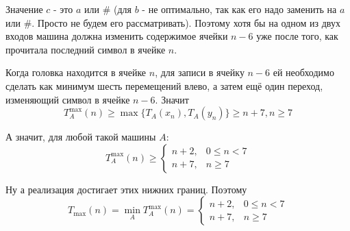 \documentclass[12pt]{article}
\begin{document}
Значение $c$ - это $a$ или $\#$ (для $b$ - не оптимально,
так как его надо заменить на $a$ или $\#$. Просто не будем
его рассматривать). Поэтому хотя бы на одном
из двух входов машина должна изменить содержимое ячейки $n-6$ уже
после того, как прочитала последний символ в ячейке $n$.

Когда головка находится в ячейке $n$, для записи в ячейку $n-6$ ей
необходимо сделать как минимум шесть перемещений влево, а затем ещё
один переход, изменяющий символ в ячейке $n-6$. Значит
\[
T_A^{\max}(n)\geq \max\{T_A(x_n),T_A(y_n)\}\geq n+7, n\geq7
\]

А значит, для любой такой машины $A$:
\[
T_A^{\max}(n)\geq
\begin{cases}
n+2, & 0\leq n<7\\
n+7, & n\geq7
\end{cases}
\]

Ну а реализация достигает этих нижних границ. Поэтому
\[
T_{\max}(n) = \min_A T_A^{\max}(n)=
\begin{cases}
n+2, & 0\leq n<7\\
n+7, & n\geq7
\end{cases}
\]
\end{document}
